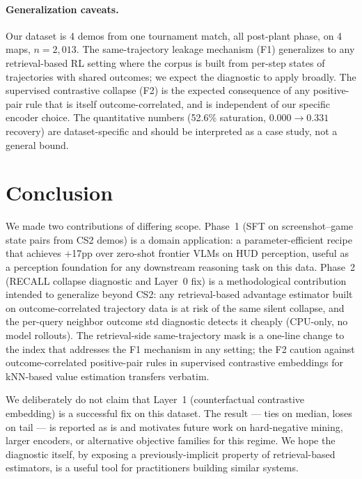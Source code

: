 \documentclass{article}
\begin{document}
\paragraph{Generalization caveats.} Our dataset is 4 demos from one tournament match, all post-plant phase, on 4 maps, $n{=}2{,}013$. The same-trajectory leakage mechanism (F1) generalizes to any retrieval-based RL setting where the corpus is built from per-step states of trajectories with shared outcomes; we expect the diagnostic to apply broadly. The supervised contrastive collapse (F2) is the expected consequence of any positive-pair rule that is itself outcome-correlated, and is independent of our specific encoder choice. The quantitative numbers (52.6\% saturation, $0.000 \to 0.331$ recovery) are dataset-specific and should be interpreted as a case study, not a general bound.


\section{Conclusion}
\label{sec:conclusion}

We made two contributions of differing scope. Phase~1 (SFT on screenshot--game state pairs from CS2 demos) is a domain application: a parameter-efficient recipe that achieves +17pp over zero-shot frontier VLMs on HUD perception, useful as a perception foundation for any downstream reasoning task on this data. Phase~2 (RECALL collapse diagnostic and Layer~0 fix) is a methodological contribution intended to generalize beyond CS2: any retrieval-based advantage estimator built on outcome-correlated trajectory data is at risk of the same silent collapse, and the per-query neighbor outcome std diagnostic detects it cheaply (CPU-only, no model rollouts). The retrieval-side same-trajectory mask is a one-line change to the index that addresses the F1 mechanism in any setting; the F2 caution against outcome-correlated positive-pair rules in supervised contrastive embeddings for kNN-based value estimation transfers verbatim.

We deliberately do not claim that Layer~1 (counterfactual contrastive embedding) is a successful fix on this dataset. The result --- ties on median, loses on tail --- is reported as is and motivates future work on hard-negative mining, larger encoders, or alternative objective families for this regime. We hope the diagnostic itself, by exposing a previously-implicit property of retrieval-based estimators, is a useful tool for practitioners building similar systems.
\end{document}
